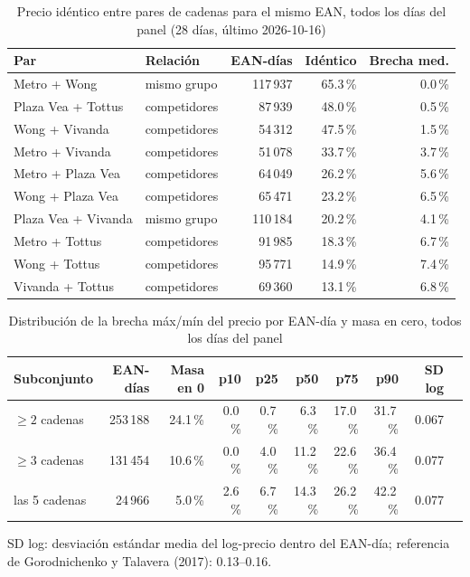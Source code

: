 
\begin{table}[htbp]
\caption{Precio id\'entico entre pares de cadenas para el mismo EAN, todos los d\'ias del panel (28 d\'ias, \'ultimo 2026-10-16)}
\label{tab:identidad}
\centering\scriptsize\setlength{\tabcolsep}{3pt}
\begin{tabular}{@{}llrrr@{}}
\toprule
Par & Relaci\'on & EAN-d\'ias & Id\'entico & Brecha med. \\
\midrule
Metro + Wong & mismo grupo & 117\,937 & 65.3\,\% & 0.0\,\% \\
Plaza Vea + Tottus & competidores & 87\,939 & 48.0\,\% & 0.5\,\% \\
Wong + Vivanda & competidores & 54\,312 & 47.5\,\% & 1.5\,\% \\
Metro + Vivanda & competidores & 51\,078 & 33.7\,\% & 3.7\,\% \\
Metro + Plaza Vea & competidores & 64\,049 & 26.2\,\% & 5.6\,\% \\
Wong + Plaza Vea & competidores & 65\,471 & 23.2\,\% & 6.5\,\% \\
Plaza Vea + Vivanda & mismo grupo & 110\,184 & 20.2\,\% & 4.1\,\% \\
Metro + Tottus & competidores & 91\,985 & 18.3\,\% & 6.7\,\% \\
Wong + Tottus & competidores & 95\,771 & 14.9\,\% & 7.4\,\% \\
Vivanda + Tottus & competidores & 69\,360 & 13.1\,\% & 6.8\,\% \\
\bottomrule\end{tabular}\end{table}

\begin{table}[t]
\caption{Distribuci\'on de la brecha m\'ax/m\'in del precio por EAN-d\'ia y masa en cero, todos los d\'ias del panel}
\label{tab:brecha}
\centering\scriptsize\setlength{\tabcolsep}{4pt}
\begin{tabular}{@{}lrrrrrrrrr@{}}
\toprule
Subconjunto & EAN-d\'ias & Masa en 0 & p10 & p25 & p50 & p75 & p90 & SD log \\
\midrule
$\geq 2$ cadenas & 253\,188 & 24.1\,\% & 0.0\,\% & 0.7\,\% & 6.3\,\% & 17.0\,\% & 31.7\,\% & 0.067 \\
$\geq 3$ cadenas & 131\,454 & 10.6\,\% & 0.0\,\% & 4.0\,\% & 11.2\,\% & 22.6\,\% & 36.4\,\% & 0.077 \\
las 5 cadenas & 24\,966 & 5.0\,\% & 2.6\,\% & 6.7\,\% & 14.3\,\% & 26.2\,\% & 42.2\,\% & 0.077 \\
\bottomrule\end{tabular}
\par\smallskip\raggedright\scriptsize SD log: desviaci\'on est\'andar media del log-precio dentro del EAN-d\'ia; referencia de Gorodnichenko y Talavera (2017): 0.13--0.16.
\end{table}

